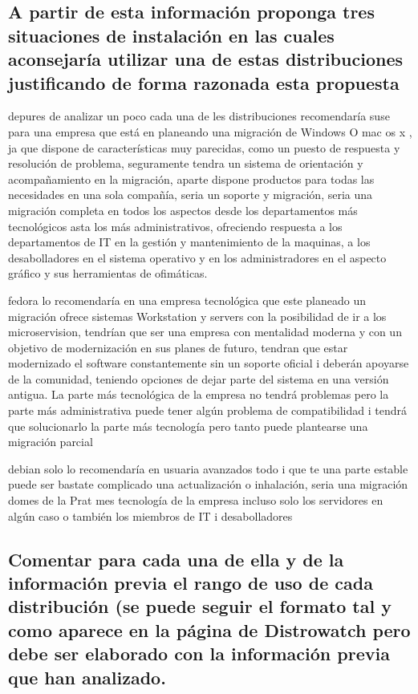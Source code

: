 \documentclass[preprint,11pt]{elsarticle}
\begin{document}
\subsection{A partir de esta información proponga tres situaciones de instalación en las cuales aconsejaría utilizar una de estas distribuciones justificando de forma razonada esta propuesta}\bigskip

depures de analizar un poco cada una de les distribuciones recomendaría suse para una empresa que está en planeando una migración de Windows O mac os x , ja que dispone de características muy parecidas, como un puesto de respuesta y resolución de problema, seguramente tendra un sistema de orientación y acompañamiento en la migración, aparte dispone productos para todas las necesidades en una sola compañía, seria un soporte y migración, seria una migración completa en todos los aspectos desde los departamentos más tecnológicos asta los más administrativos, ofreciendo respuesta a los departamentos de IT en la gestión y mantenimiento de la maquinas, a los desabolladores en el sistema operativo y en los administradores en el aspecto gráfico y sus herramientas de ofimáticas.\bigskip

fedora lo recomendaría en una empresa tecnológica que este planeado un migración ofrece sistemas Workstation y servers con la posibilidad de ir a los microservision, tendrían que ser una empresa con mentalidad moderna y con un objetivo de modernización en sus planes de futuro, tendran que estar modernizado el software constantemente sin un soporte oficial i deberán apoyarse de la comunidad, teniendo opciones de dejar parte del sistema en una versión antigua. La parte más tecnológica de la empresa no tendrá problemas pero la parte más administrativa puede tener algún problema de compatibilidad i tendrá que solucionarlo la parte más tecnología pero tanto puede plantearse una migración parcial\bigskip


debian solo lo recomendaría en usuaria avanzados todo i que te una parte estable puede ser bastate complicado una actualización o inhalación, seria una migración domes de la Prat mes tecnología de la empresa incluso solo los servidores en algún caso o también los miembros de IT i desabolladores\bigskip

\subsection{ Comentar para cada una de ella y de la información previa el rango de uso de cada distribución (se puede seguir el formato tal y como aparece en la página de Distrowatch pero debe ser elaborado con la información previa que han analizado.}\bigskip
\end{document}
